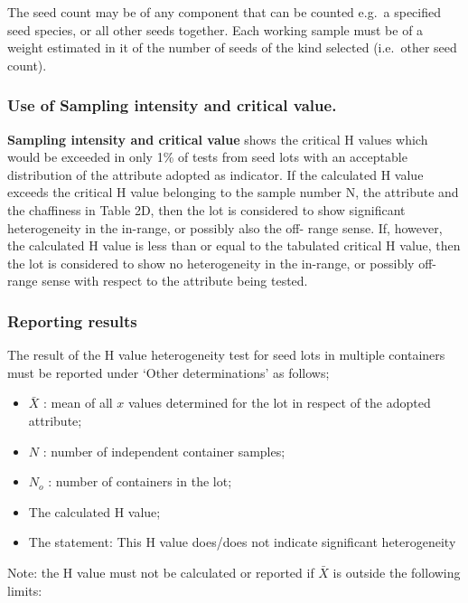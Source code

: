 \documentclass[]{book}
\providecommand{\tightlist}{%
  \setlength{\itemsep}{0pt}\setlength{\parskip}{0pt}}
\begin{document}
The seed count may be of any component that can be counted e.g.~a
specified seed species, or all other seeds together. Each working sample
must be of a weight estimated in it of the number of seeds of the kind
selected (i.e.~other seed count).

\subsubsection{Use of Sampling intensity and critical
value.}\label{use-of-sampling-intensity-and-critical-value.}

\textbf{Sampling intensity and critical value} shows the critical H
values which would be exceeded in only 1\% of tests from seed lots with
an acceptable distribution of the attribute adopted as indicator. If the
calculated H value exceeds the critical H value belonging to the sample
number N, the attribute and the chaffiness in Table 2D, then the lot is
considered to show significant heterogeneity in the in-range, or
possibly also the off- range sense. If, however, the calculated H value
is less than or equal to the tabulated critical H value, then the lot is
considered to show no heterogeneity in the in-range, or possibly
off-range sense with respect to the attribute being tested.

\subsubsection{Reporting results}\label{reporting-results}

The result of the H value heterogeneity test for seed lots in multiple
containers must be reported under `Other determinations' as follows;

\begin{itemize}
\tightlist
\item
  \(\bar{X}\) : mean of all \(x\) values determined for the lot in
  respect of the adopted attribute;
\item
  \(N\) : number of independent container samples;
\item
  \(N_o\) : number of containers in the lot;
\item
  The calculated H value;
\item
  The statement: This H value does/does not indicate significant
  heterogeneity
\end{itemize}

Note: the H value must not be calculated or reported if \(\bar{X}\) is
outside the following limits:
\end{document}
